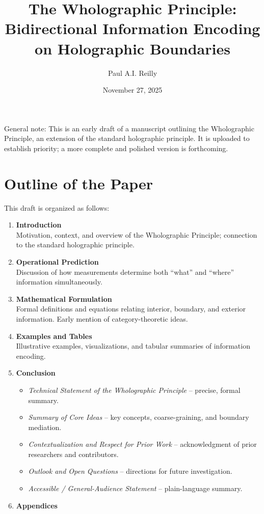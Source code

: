 ﻿\documentclass[12pt]{article}
\title{The Wholographic Principle: Bidirectional Information Encoding on Holographic Boundaries}
\author{Paul A.I. Reilly}
\date{November 27, 2025}
\begin{document}
\maketitle
General note: This is an early draft of a manuscript outlining the Wholographic Principle, an extension of the standard holographic principle. It is uploaded to establish priority; a more complete and polished version is forthcoming.
\section*{Outline of the Paper}
This draft is organized as follows:
\begin{enumerate}
    \item \textbf{Introduction} \\
    Motivation, context, and overview of the Wholographic Principle; connection to the standard holographic principle.
    \item \textbf{Operational Prediction} \\
    Discussion of how measurements determine both ``what'' and ``where'' information simultaneously.
    \item \textbf{Mathematical Formulation} \\
    Formal definitions and equations relating interior, boundary, and exterior information. Early mention of category-theoretic ideas.
    \item \textbf{Examples and Tables} \\
    Illustrative examples, visualizations, and tabular summaries of information encoding.
    \item \textbf{Conclusion} \\
    \begin{itemize}
        \item \emph{Technical Statement of the Wholographic Principle} -- precise, formal summary.
        \item \emph{Summary of Core Ideas} -- key concepts, coarse-graining, and boundary mediation.
        \item \emph{Contextualization and Respect for Prior Work} -- acknowledgment of prior researchers and contributors.
        \item \emph{Outlook and Open Questions} -- directions for future investigation.
        \item \emph{Accessible / General-Audience Statement} -- plain-language summary.
    \end{itemize}
    \item \textbf{Appendices} \\

\end{enumerate}
\end{document}
